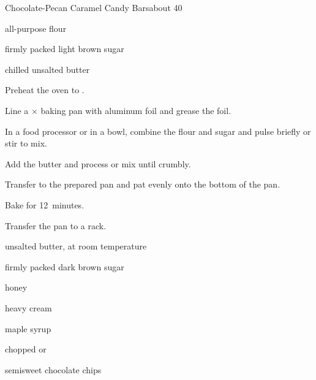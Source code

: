 \begin{recipe}{Chocolate-Pecan Caramel Candy Bars}{}{about 40}


\begin{ingredients}
\item \C{1 \half} all-purpose flour
\item \C{\half} firmly packed light brown sugar
\item \C{\half} chilled unsalted butter
\end{ingredients}

\begin{directions}
\item Preheat the oven to .
\item Line a $\times$ baking pan with aluminum foil and grease the foil.
\item In a food processor or in a bowl, combine the flour and sugar and pulse briefly or stir to mix.
\item Add the butter and process or mix until crumbly.
\item Transfer to the prepared pan and pat evenly onto the bottom of the pan.
\item Bake for 12~minutes.
\item Transfer the pan to a rack.
\end{directions}


\begin{ingredients}
\item {} unsalted butter, at room temperature
\item {} firmly packed dark brown sugar
\item {} honey
\item {} heavy cream
\item {} maple syrup
\item \C{1 \half} chopped  or 
\item \C{\half} semisweet chocolate chips
\end{ingredients}


\end{recipe}
